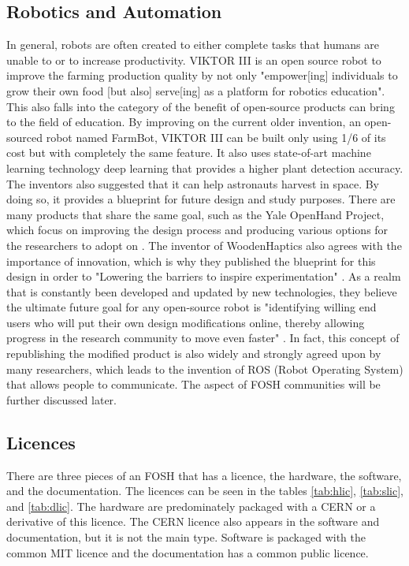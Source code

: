\documentclass[final-report.tex]{subfiles}
\begin{document}
\subsection{Robotics and Automation}
In general, robots are often created to either complete tasks that humans are unable to or to increase productivity. 
VIKTOR III is an open source robot to improve the farming production quality by not only "empower[ing] individuals to grow their own food [but also] serve[ing] as a platform for robotics education".
This also falls into the category of the benefit of open-source products can bring to the field of education. By improving on the current older invention, an open-sourced robot named FarmBot, VIKTOR III can be built only using 1/6 of its cost but with completely the same feature. 
It also uses state-of-art machine learning technology deep learning that provides a higher plant detection accuracy. 
The inventors also suggested that it can help astronauts harvest in space. 
By doing so, it provides a blueprint for future design and study purposes. 
There are many products that share the same goal, such as the Yale OpenHand Project, which focus on improving the design process and producing various options for the researchers to adopt on \cite{ma2017yale}. 
The inventor of WoodenHaptics also agrees with the importance of innovation, which is why they published the blueprint for this design in order to "Lowering the barriers to inspire experimentation" \cite{yip2017spurring}. 
As a realm that is constantly been developed and updated by new technologies, they believe the ultimate future goal for any open-source robot is "identifying willing end users who will put their own design modifications online, thereby allowing progress in the research community to move even faster" \cite{yip2017spurring}. 
In fact, this concept of republishing the modified product is also widely and strongly agreed upon by many researchers, which leads to the invention of ROS\cite{alami2018influencers} (Robot Operating System) that allows people to communicate. 
The aspect of FOSH communities will be further discussed later. 

\subsection{Licences}
There are three pieces of an FOSH that has a licence, the hardware, the software, and the documentation.
The licences can be seen in the tables \ref{tab:hlic}, \ref{tab:slic}, and \ref{tab:dlic}.
The hardware are predominately packaged with a CERN or a derivative of this licence.
The CERN licence also appears in the software and documentation, but it is not the main type. 
Software is packaged with the common MIT licence and the documentation has a common public licence.


\end{document}
